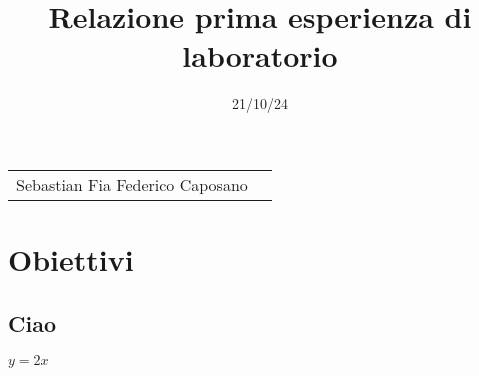 \documentclass{article}
\title{Relazione prima esperienza di laboratorio
}
\author{}
\date{21/10/24}
\begin{document}
	
	\maketitle
	
	\noindent\begin{tabular}{@{}ll}
		Sebastian Fia 
		Federico Caposano
		
	\end{tabular}
	
	
	
	\section*{Obiettivi}
	\subsection*{Ciao}
	$y = 2x$
	
	
	
	
	
	
\end{document}
